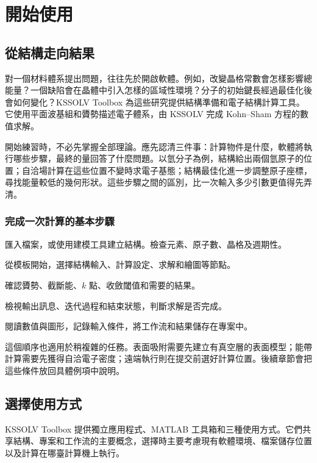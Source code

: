 \chapter{開始使用 }\label{ch:introduction}

\section{從結構走向結果}
對一個材料體系提出問題，往往先於開啟軟體。例如，改變晶格常數會怎樣影響總能量？一個缺陷會在晶體中引入怎樣的區域性環境？分子的初始鍵長經過最佳化後會如何變化？KSSOLV Toolbox 為這些研究提供結構準備和電子結構計算工具。它使用平面波基組和贗勢描述電子體系，由 KSSOLV 完成 Kohn--Sham 方程的數值求解。

開始練習時，不必先掌握全部理論。應先認清三件事：計算物件是什麼，軟體將執行哪些步驟，最終的量回答了什麼問題。以氫分子為例，結構給出兩個氫原子的位置；自洽場計算在這些位置不變時求電子基態；結構最佳化進一步調整原子座標，尋找能量較低的幾何形狀。這些步驟之間的區別，比一次輸入多少引數更值得先弄清。

\subsection{完成一次計算的基本步驟}
\begin{steps}
\item {}匯入檔案，或使用建模工具建立結構。檢查元素、原子數、晶格及週期性。
\item {}從模板開始，選擇結構輸入、計算設定、求解和繪圖等節點。
\item {}確認贗勢、截斷能、$k$ 點、收斂閾值和需要的結果。
\item {}檢視輸出訊息、迭代過程和結束狀態，判斷求解是否完成。
\item {}閱讀數值與圖形，記錄輸入條件，將工作流和結果儲存在專案中。
\end{steps}

這個順序也適用於稍複雜的任務。表面吸附需要先建立有真空層的表面模型；能帶計算需要先獲得自洽電子密度；遠端執行則在提交前選好計算位置。後續章節會把這些條件放回具體例項中說明。

\section{選擇使用方式}
KSSOLV Toolbox 提供獨立應用程式、MATLAB\regmark{} 工具箱和\ksonline{}三種使用方式。它們共享結構、專案和工作流的主要概念，選擇時主要考慮現有軟體環境、檔案儲存位置以及計算在哪臺計算機上執行。

